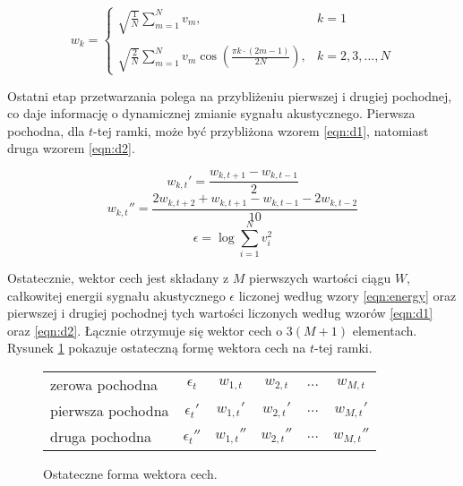\documentclass[11pt]{article}
\begin{document}
	 \begin{equation}
		w_k = 
		\begin{cases}
			\sqrt{\frac{1}{N}}\sum_{m=1}^{N}v_m, & k = 1 \\
			&\\
			\sqrt{\frac{2}{N}}\sum_{m=1}^{N}{v_m \cos(\frac{\pi k \cdot (2m - 1)}{2N})}, & k = 2,3,\ldots,N
		\end{cases}
		\label{eqn:DCT}
	 \end{equation}
	 
	 Ostatni etap przetwarzania polega na przybliżeniu pierwszej i drugiej pochodnej, co daje informację o dynamicznej zmianie sygnału akustycznego. Pierwsza pochodna, dla $t$-tej ramki, może być przybliżona wzorem \ref{eqn:d1}, natomiast druga wzorem \ref{eqn:d2}.
	 
	 \begin{equation}
	 	 w_{k,t}'=\frac{w_{k,t+1}-w_{k,t-1}}{2}
	 	 \label{eqn:d1}
	 \end{equation}
	 \begin{equation}
		 w_{k,t}''=\frac{2w_{k,t+2}+w_{k,t+1}-w_{k,t-1}-2w_{k,t-2}}{10}
		 \label{eqn:d2}
	 \end{equation}
	 \begin{equation}
	 	\epsilon = \log \sum_{i=1}^N {v_i^2}
	 	\label{eqn:energy}
	 \end{equation}
	 
	 Ostatecznie, wektor cech jest składany z $M$ pierwszych wartości ciągu $W$, całkowitej energii sygnału akustycznego $\epsilon$ liczonej według wzory \ref{eqn:energy} oraz pierwszej i drugiej pochodnej tych wartości liczonych według wzorów \ref{eqn:d1} oraz \ref{eqn:d2}. Łącznie otrzymuje się wektor cech o $3(M+1)$ elementach. Rysunek \ref{fig:feature_vector} pokazuje ostateczną formę wektora cech na $t$-tej ramki.
	 
	
	\begin{figure}
		\begin{center}
			\begin{tabular}{l|ccccc}
				zerowa pochodna   & $\epsilon_t$   & $w_{1,t}$   & $w_{2,t}$   & $\ldots$ & $w_{M,t}$   \\
				pierwsza pochodna & $\epsilon_t'$  & $w_{1,t}'$  & $w_{2,t}'$  & $\ldots$ & $w_{M,t}'$  \\
				druga pochodna    & $\epsilon_t''$ & $w_{1,t}''$ & $w_{2,t}''$ & $\ldots$ & $w_{M,t}''$ \\
			\end{tabular}
			\label{fig:feature_vector}
			\caption{Ostateczne forma wektora cech.}
		\end{center}
	\end{figure}
\end{document}
